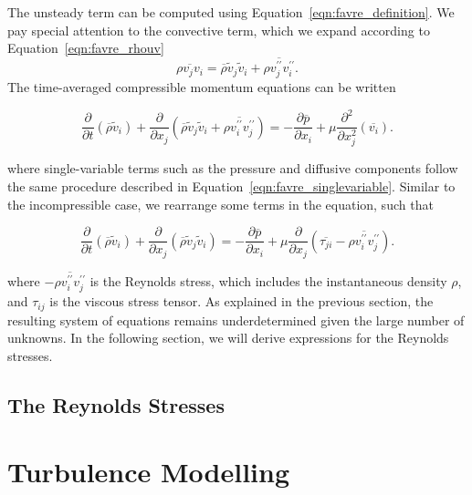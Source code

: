 The unsteady term can be computed using Equation~\ref{eqn:favre_definition}. We pay special attention to the convective term, which we expand according to Equation~\ref{eqn:favre_rhouv}
\begin{equation}
    \overline{\rho v_j v_i} = \overline{\rho}\tilde v_j\tilde v_i + \overline{\rho v_j^{\prime\prime} v_i^{\prime\prime}}.
\end{equation}
The time-averaged compressible momentum equations can be written
\begin{eqBox}
\begin{equation}
    \frac{\partial }{\partial t} \left(\overline\rho \tilde v_i \right)
    + \frac{\partial}{\partial x_j} \left(\overline\rho \tilde v_j \tilde v_i + \overline{\rho v_i^{\prime\prime}v_j^{\prime\prime}} \right)
    = - \frac{\partial \overline{p}}{\partial x_i} 
    + \mu \frac{\partial^2 }{\partial x_j^2} \left(\overline{v_i}\right).
\end{equation}
\end{eqBox}
where single-variable terms such as the pressure and diffusive components follow the same procedure described in Equation~\ref{eqn:favre_singlevariable}. Similar to the incompressible case, we rearrange some terms in the equation, such that
\begin{eqBox}
    \begin{equation}
        \frac{\partial }{\partial t} \left(\overline\rho \tilde v_i \right)
        + \frac{\partial}{\partial x_j} \left(\overline\rho \tilde v_j \tilde v_i \right)
        = - \frac{\partial \overline{p}}{\partial x_i} 
        + \mu \frac{\partial }{\partial x_j} \left(\overline{\tau_{ji}} - \overline{\rho v_i^{\prime\prime}v_j^{\prime\prime}}\right).
    \end{equation}
\end{eqBox}
where $-\overline{\rho v_i^{\prime\prime}v_j^{\prime\prime}}$ is the Reynolds stress, which includes the instantaneous density $\rho$, and $\tau_{ij}$ is the viscous stress tensor. As explained in the previous section, the resulting system of equations remains underdetermined given the large number of unknowns. In the following section, we will derive expressions for the Reynolds stresses.

\subsection{The Reynolds Stresses}
\section{Turbulence Modelling}
